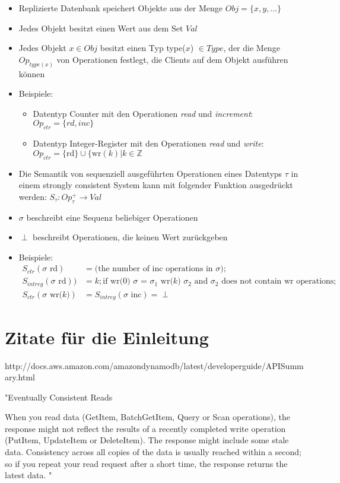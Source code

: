 \documentclass[11pt,a4paper,ngerman]{scrartcl}
\begin{document}
\begin{itemize}
\item Replizierte Datenbank speichert Objekte aus der Menge $Obj = \lbrace x,y,...\rbrace$
\item Jedes Objekt besitzt einen Wert aus dem Set $Val$
\item Jedes Objekt $x \in Obj$ besitzt einen Typ type($x$) $\in Type$, der die Menge $Op_{type(x)}$ von Operationen festlegt, die Clients auf dem Objekt ausführen können
\item Beispiele:
\begin{itemize}
\item Datentyp Counter mit den Operationen \textit{read} und \textit{increment}: $Op_{ctr} = \lbrace rd,inc\rbrace$
\item Datentyp Integer-Register mit den Operationen \textit{read} und \textit{write}: $Op_{ctr} = \lbrace \text{rd}\rbrace \cup \lbrace \text{wr}(k) | k \in \mathbb{Z}$
\end{itemize}
\item Die Semantik von sequenziell ausgeführten Operationen eines Datentyps $\tau$ in einem strongly consistent System kann mit folgender Funktion ausgedrückt werden: $S_{\tau} : Op_{\tau}^+ \rightarrow Val$
\item $\sigma$ beschreibt eine Sequenz beliebiger Operationen
\item $\perp$ beschreibt Operationen, die keinen Wert zurückgeben
\item Beispiele:
\begin{align} 
S_{ctr}(\sigma \text{ rd}) &= \text{(the number of inc operations in $\sigma$);} \\
S_{intreg}(\sigma \text{ rd})) &= k; \text{if wr(0) $\sigma$ = $\sigma_1$ wr($k$) $\sigma_2$ and $\sigma_2$ does not contain wr operations;} \\
S_{ctr}(\sigma \text{ wr($k$)}) &= S_{intreg}(\sigma \text{ inc}) = \perp 
\end{align}

\end{itemize}

\section{Zitate für die Einleitung}
http://docs.aws.amazon.com/amazondynamodb/latest/developerguide/APISummary.html

"Eventually Consistent Reads

When you read data (GetItem, BatchGetItem, Query or Scan operations), the response might not reflect the results of a recently completed write operation (PutItem, UpdateItem or DeleteItem). The response might include some stale data. Consistency across all copies of the data is usually reached within a second; so if you repeat your read request after a short time, the response returns the latest data. "
\end{document}
